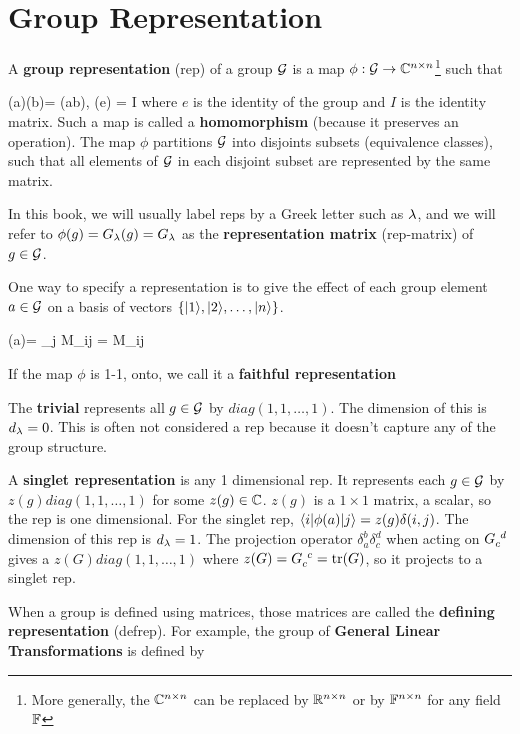 \section{Group  Representation}

A {\bf group representation} (rep)
of a group ${\cal G}$
is a map $\phi: {\cal G}\rightarrow { \mathbb{C}}^{n\times n}$\footnote{More generally, the ${ \mathbb{C}}^{n\times n}$ can be replaced by ${ \mathbb{R}}^{n\times n}$ or by ${ \mathbb{F}}^{n\times n}$ for any field ${ \mathbb{F}}$} such that

\beq
\phi(a)\phi(b)=
\phi(ab),
\quad \phi(e) = I
\eeq
where $e$ is the
identity of the group
and $I$ 
is the identity matrix.
Such a map is called a {\bf homomorphism}
(because it preserves an operation).
The map $\phi$ 
partitions ${\cal G}$
into disjoints subsets (equivalence classes),
such that all elements of ${\cal G}$ in each disjoint subset 
are represented by the same matrix.

In this book, 
we will usually
label reps by a 
Greek letter
such as $\lambda$,
and we will refer to
$\phi(g)=G_\lambda(g)=G_\lambda$ as the
{\bf representation matrix} (rep-matrix) of $g\in{\cal G}$.

One  way to specify a representation is
to give the effect of each group element $a\in {\cal G}$ on a basis of vectors $\{|1\rangle, |2\rangle, \dots, |n\rangle\}$.


\beq
\phi (a)= \sum_j M_{ij}
\implies {} = M_{ij}
\eeq

If the map $\phi$
is 1-1, onto, we call it a {\bf faithful representation} 

The {\bf trivial }
represents all $g\in {\cal G}$
by  $diag(1,1, \dots, 1)$.
The dimension 
of this  is $d_\lambda=0$.
This  is often not
considered a rep because it
doesn't capture any of the group structure.

A {\bf singlet representation}
is any 1 dimensional rep. It represents each
$g\in {\cal G}$
by  $ z(g) diag(1,1, \dots, 1)$
for some $z(g)\in{ \mathbb{C}}$.
$z(g)$ is a $1\times 1$ matrix, a scalar,
so the rep is one dimensional.
For the singlet rep, $\left\langle i|\phi(a)|j\right\rangle=z(g)
\delta(i,j)$.
The dimension 
of this rep is $d_\lambda=1$.
The projection operator
$\delta_a^b \delta_c^d$
when acting on $G\indices{_c^d}$
gives a $ z(G) diag(1,1, \dots, 1)$
where $z(G)=G\indices{_c^c}=\tr(G)$, so it
projects to a singlet rep.



When a group is 
defined using matrices, those
matrices are called the {\bf defining representation} (defrep). For example,
the group
of {\bf General Linear Transformations}
is defined by

